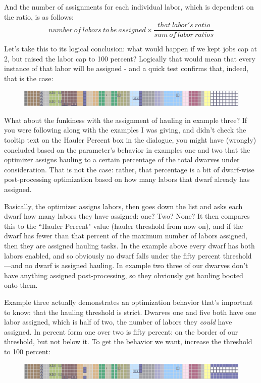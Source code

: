 \documentclass[]{article}
\begin{document}
And the number of assignments for each individual labor, which is dependent on the ratio, is as follows:
\begin{displaymath}
number\:of\:labors\:to\:be\:assigned \times \frac{that\:labor's\:ratio}{sum\:of\:labor\:ratios}
\end{displaymath}

Let's take this to its logical conclusion: what would happen if we kept jobs cap at 2, but raised the
labor cap to 100 percent? Logically that would mean that every instance of that labor will be assigned -
and a quick test confirms that, indeed, that is the case:
\begin{figure}[h!] \centering
\includegraphics[width=\linewidth]{Sec4Fig13}
\end{figure}

What about the funkiness with the assignment of hauling in example three? If you were following along
with the examples I was giving, and didn't check the tooltip text on the Hauler Percent box in the
dialogue, you might have (wrongly) concluded based on the parameter's behavior in examples one and two
that the optimizer assigns hauling to a certain percentage of the total dwarves under consideration. That
is not the case: rather, that percentage is a bit of dwarf-wise post-processing optimization based on how
many labors that dwarf already has assigned.

Basically, the optimizer assigns labors, then goes down the list and asks each dwarf how many labors they
have assigned: one? Two? None? It then compares this to the ``Hauler Percent" value (hauler threshold
from now on), and if the dwarf has fewer than that percent of the maximum number of labors assigned, then
they are assigned hauling tasks. In the example above every dwarf has both labors enabled, and so
obviously no dwarf falls under the fifty percent threshold---and no dwarf is assigned hauling. In example
two three of our dwarves don't have anything assigned post-processing, so they obviously get hauling
booted onto them.

Example three actually demonstrates an optimization behavior that's important to know: that the hauling
threshold is strict. Dwarves one and five both have one labor assigned, which is half of two, the number
of labors they \emph{could} have assigned. In percent form one over two is fifty percent: on the border
of our threshold, but not below it. To get the behavior we want, increase the threshold to 100 percent:
\begin{figure}[h!]
\centering
\includegraphics[width=\linewidth]{Sec4Fig14}
\end{figure}
\end{document}
